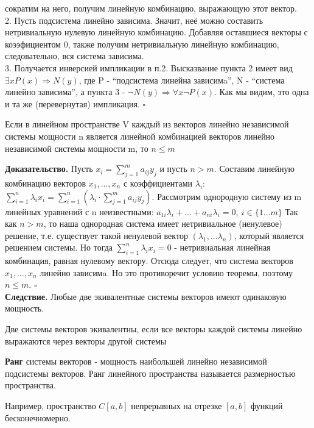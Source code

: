 сократим на него, получим линейную комбинацию, выражающую этот вектор.\\
2. Пусть подсистема линейно зависима. Значит, неё можно составить нетривиальную
нулевую линейную комбинацию.
Добавляя оставшиеся векторы с коээфициентом 0, также получим нетривиальную 
линейную комбинацию, следовательно, вся система зависима. \\
3. Получается инверсией импликации в п.2. Высказвание пункта 2 имеет вид 
$\exists x P(x)\Rightarrow N(y)$, где P - ``подсистема линейна зависимa'', N -
``система линейно
зависима'', а пункта 3 - $\neg N(y)\Rightarrow\forall x\neg P(x)$. Как мы
видим, это одна и та же (перевернутая) импликация. $\square$\\

\begin{theor}
Если в линейном пространстве V каждый из векторов линейно независимой системы
мощности n является линейной комбинацией векторов линейно независимой системы
мощности m, то $n\leqslant m$
\end{theor}
\textbf{Доказательство.} Пусть $x_i=\sum\limits_{j=1}^{m}a_{ij}y_j$ и пусть
$n>m$. Составим линейную комбинацию векторов $x_1,...,x_n$ с
коэффициентами $\lambda_i$: 
$\sum\limits^n_{i=1}\lambda_ix_i=\sum\limits^n_{i=1}
(\lambda_i\cdot\sum\limits_{j=1}^{m}a_{ij}y_j)$. Рассмотрим 
однородную систему из m линейных уравнений с n неизвестными:
$a_{1i}\lambda_i+...+a_{ni}\lambda_i=0,~i\in\{1...m\}$
Так как $n>m$, то наша однородная система имеет нетривиальное (ненулевое)
решение, т.е. существует такой ненулевой вектор $(\lambda_1,...\lambda_n)$, 
который является решением системы. Но тогда $\sum\limits_{i=1}^{n}
\lambda_ix_i=0$ - нетривиальная  
линейная комбинация, равная нулевому вектору. Отсюда следует, что система
векторов $x_1,...,x_n$ линейно зависимa. Но это противоречит условию теоремы,
поэтому $n\leqslant m$. $\square$\\
\textbf{Следствие.} Любые две экивалентные системы векторов имеют одинаковую
мощность.
\begin{defin}
Две системы векторов экивалентны, если все векторы каждой системы линейно 
выражаются через векторы другой системы
\end{defin}
\begin{defin}
\textbf{Ранг} системы векторов - мощность наибольшей линейно независимой 
подсистемы векторов. Ранг линейного пространства называется размерностью 
пространства.
\end{defin}
Например, пространство $C[a,b]$ непрерывных на отрезке $[a,b]$ функций 
бесконечномерно.


